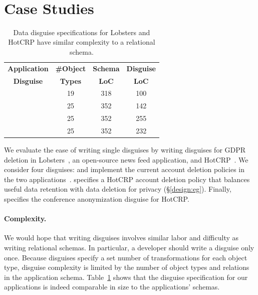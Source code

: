 \
\section{Case Studies}
\label{sec:hotcrp_example}

\begin{table}[t!]
    \centering
    \footnotesize
    \begin{tabular}{@{}cccc@{}}
        \textbf{Application} & \textbf{\#Object} & \textbf{Schema} &
        \textbf{Disguise} \\
        \textbf{Disguise} & \textbf{Types} & \textbf{LoC} & \textbf{LoC} \\
    \midrule
    \lrtbf & 19 & 318 & 100 \\
    \hrtbf & 25 & 352 & 142 \\
    \hrtbfplus & 25 & 352 & 255 \\
    \hconfanon & 25 & 352 & 232 \\
\end{tabular}
    \caption{Data disguise specifications for Lobsters and HotCRP have similar complexity to
    a relational schema.
}
\label{tab:loc}
\end{table}

%
We evaluate the ease of writing single disguises by writing disguises for GDPR deletion in
Lobsters~\cite{lobsters}, an open-source news feed application, and HotCRP~\cite{hotcrp}.
%
We consider four disguises: \lrtbf and \hrtbf implement the current account
deletion policies in the two applications~\cite{lobsters:privacy, hotcrp:privacy}.
%
\hrtbfplus specifies a HotCRP account deletion policy that balances useful data retention with
data deletion for privacy (\S\ref{design:eg}).
%
Finally, \hconfanon specifies the conference anonymization disguise for HotCRP.

\paragraph{Complexity.}
%
We would hope that writing disguises involves similar labor and difficulty as writing
relational schemas.
%
In particular, a developer should write a disguise only once.
%
Because disguises specify a set number of transformations for each object type,
disguise complexity is limited by the number of object types and relations in the
application schema.
%
Table~\ref{tab:loc} shows that the disguise specification for our applications is indeed
comparable in size to the applications' schemas.
%


